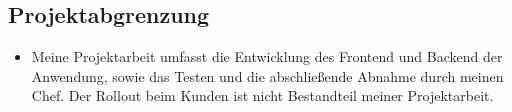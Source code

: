 \subsection{Projektabgrenzung} 
\label{sec:Projektabgrenzung}
\begin{itemize}
	\item Meine Projektarbeit umfasst die Entwicklung des Frontend und Backend der Anwendung, sowie das Testen und die abschließende Abnahme durch meinen Chef. Der Rollout beim Kunden ist nicht Bestandteil meiner Projektarbeit.
\end{itemize}
